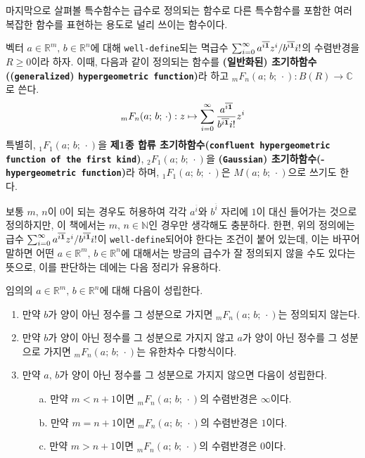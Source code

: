 마지막으로 살펴볼 특수함수는 급수로 정의되는 함수로 다른 특수함수를 포함한 여러 복잡한 함수를 표현하는 용도로 널리 쓰이는 함수이다.

\begin{definition}
    벡터 $a\in\mathbb{R}^m,\,b\in\mathbb{R}^n$에 대해 \texttt{well-define}되는 멱급수 $\sum_{i=0}^\infty a^{\overline{i\mathbf{1}}}z^i/b^{\overline{i\mathbf{1}}}i!$의 수렴반경을 $R\geq0$이라 하자. 이때, 다음과 같이 정의되는 함수를 \textbf{(일반화된) 초기하함수((\texttt{generalized}) \texttt{hypergeometric function})}라 하고 $_mF_n(a;\,b;\,\cdot):B(R)\to\mathbb{C}$로 쓴다.
    \begin{equation*}
        _mF_n(a;\,b;\,\cdot):z\mapsto\sum_{i=0}^\infty\frac{a^{\overline{i\mathbf{1}}}}{b^{\overline{i\mathbf{1}}}i!}z^i
    \end{equation*}
    특별히, $_1F_1(a;\,b;\,\cdot)$을 \textbf{제1종 합류 초기하함수(\texttt{confluent hypergeometric function of the first kind})}, $_2F_1(a;\,b;\,\cdot)$을 \textbf{(\texttt{Gaussian}) 초기하함수(- \texttt{hypergeometric function})}라 하며, $_1F_1(a;\,b;\,\cdot)$은 $M(a;\,b;\,\cdot)$으로 쓰기도 한다.
\end{definition}

보통 $m,\,n$이 $0$이 되는 경우도 허용하여 각각 $a^{\overline{i}}$와 $b^{\overline{i}}$ 자리에 $1$이 대신 들어가는 것으로 정의하지만, 이 책에서는 $m,\,n\in\mathbb{N}$인 경우만 생각해도 충분하다. 한편, 위의 정의에는 급수 $\sum_{i=0}^\infty a^{\overline{i\mathbf{1}}}z^i/b^{\overline{i\mathbf{1}}}i!$이 \texttt{well-define}되어야 한다는 조건이 붙어 있는데, 이는 바꾸어 말하면 어떤 $a\in\mathbb{R}^m,\,b\in\mathbb{R}^n$에 대해서는 방금의 급수가 잘 정의되지 않을 수도 있다는 뜻으로, 이를 판단하는 데에는 다음 정리가 유용하다.

\begin{theorem}
    임의의 $a\in\mathbb{R}^m,\,b\in\mathbb{R}^n$에 대해 다음이 성립한다.
    \begin{enumerate}
        \item 만약 $b$가 양이 아닌 정수를 그 성분으로 가지면 $_mF_n(a;\,b;\,\cdot)$는 정의되지 않는다.
        \item 만약 $b$가 양이 아닌 정수를 그 성분으로 가지지 않고 $a$가 양이 아닌 정수를 그 성분으로 가지면 $_mF_n(a;\,b;\,\cdot)$는 유한차수 다항식이다.
        \item 만약 $a,\,b$가 양이 아닌 정수를 그 성분으로 가지지 않으면 다음이 성립한다.
        \begin{enumerate}
            \item[a.] 만약 $m<n+1$이면 $_mF_n(a;\,b;\,\cdot)$의 수렴반경은 $\infty$이다.
            \item[b.] 만약 $m=n+1$이면 $_mF_n(a;\,b;\,\cdot)$의 수렴반경은 $1$이다.
            \item[c.] 만약 $m>n+1$이면 $_mF_n(a;\,b;\,\cdot)$의 수렴반경은 $0$이다.
        \end{enumerate}
    \end{enumerate}
\end{theorem}

